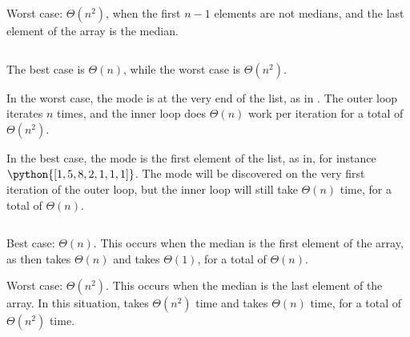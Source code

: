 \begin{prob}
\begin{subprobset}
\begin{subprob}
\begin{soln}
                Worst case: $\Theta(n^2)$, when the first $n-1$ elements are not medians, and the last element of the array is the median.
            \end{soln}
        \end{subprob}

        \begin{subprob}
            \inputminted{python}{\thisdir/include/part_d.py} 
            

            \begin{soln}
                The best case is $\Theta(n)$, while the worst case is $\Theta(n^2)$.

                In the worst case, the mode is at the very end of the list, as in 
                \python{[5, 1, 2, 7, 9, 9]}. The outer loop iterates $n$ times, and the
                inner loop does $\Theta(n)$ work per iteration for a total of $\Theta(n^2)$.

                In the best case, the mode is the first element of the list, as in, for instance
                $\python{[1, 5, 8, 2, 1, 1, 1]}$. The mode will be discovered on the very
                first iteration of the outer loop, but the inner loop will still take $\Theta(n)$
                time, for a total of $\Theta(n)$.
            \end{soln}
        \end{subprob}


        \begin{subprob}
            \inputminted{python}{\thisdir/include/part_e.py} 
            

            \begin{soln}
                Best case: $\Theta(n)$. This occurs when the median is the first element of the array,
                as then  takes $\Theta(n)$ and  takes $\Theta(1)$,
                for a total of $\Theta(n)$.

                Worst case: $\Theta(n^2)$. This occurs when the median is the last element of the
                array. In this situation,  takes $\Theta(n^2)$ time and 
                takes $\Theta(n)$ time, for a total of $\Theta(n^2)$ time.
            \end{soln}
        \end{subprob}

    \end{subprobset}


\end{prob}
